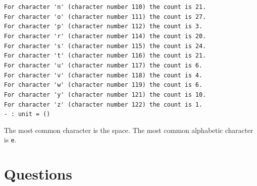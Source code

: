 \documentclass[]{book}
\newcommand\upquote[1]{\textquotesingle#1\textquotesingle}
\newcommand{\smspace}{\vspace{4mm}}
\begin{document}
\verb!For character 'n' (character number 110) the count is 21.!\\
\verb!For character 'o' (character number 111) the count is 27.!\\
\verb!For character 'p' (character number 112) the count is 3.!\\
\verb!For character 'r' (character number 114) the count is 20.!\\
\verb!For character 's' (character number 115) the count is 24.!\\
\verb!For character 't' (character number 116) the count is 21.!\\
\verb!For character 'u' (character number 117) the count is 6.!\\
\verb!For character 'v' (character number 118) the count is 4.!\\
\verb!For character 'w' (character number 119) the count is 6.!\\
\verb!For character 'y' (character number 121) the count is 10.!\\
\verb!For character 'z' (character number 122) the count is 1.!\\
\noindent\verb!- : unit = ()!\vphantom{g}
\smspace

\noindent The most common character is the space. The most common alphabetic character is \texttt{\upquote{e}}.

\clearpage
\section*{Questions}
\end{document}

